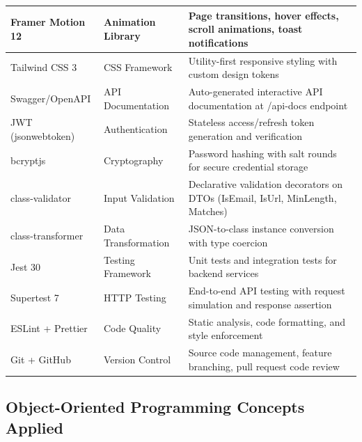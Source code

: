 \documentclass[12pt,a4paper]{report}
\begin{document}
\begin{longtable}{|p{3.5cm}|p{3.5cm}|p{5.5cm}|}
\hline
Framer Motion 12 & Animation Library & Page transitions, hover effects, scroll animations, toast notifications \\
\hline
Tailwind CSS 3 & CSS Framework & Utility-first responsive styling with custom design tokens \\
\hline
Swagger/OpenAPI & API Documentation & Auto-generated interactive API documentation at /api-docs endpoint \\
\hline
JWT (jsonwebtoken) & Authentication & Stateless access/refresh token generation and verification \\
\hline
bcryptjs & Cryptography & Password hashing with salt rounds for secure credential storage \\
\hline
class-validator & Input Validation & Declarative validation decorators on DTOs (IsEmail, IsUrl, MinLength, Matches) \\
\hline
class-transformer & Data Transformation & JSON-to-class instance conversion with type coercion \\
\hline
Jest 30 & Testing Framework & Unit tests and integration tests for backend services \\
\hline
Supertest 7 & HTTP Testing & End-to-end API testing with request simulation and response assertion \\
\hline
ESLint + Prettier & Code Quality & Static analysis, code formatting, and style enforcement \\
\hline
Git + GitHub & Version Control & Source code management, feature branching, pull request code review \\
\hline
\end{longtable}

\subsection{Object-Oriented Programming Concepts Applied}
\end{document}
